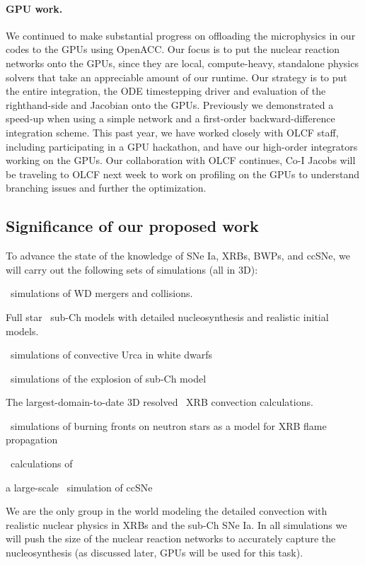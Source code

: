 \documentclass[11pt,letterpaper,english]{article}
\begin{document}
\paragraph{GPU work.}
%
We continued to make substantial progress on offloading the
microphysics in our codes to the GPUs using OpenACC.  Our focus is to
put the nuclear reaction networks onto the GPUs, since they are local,
compute-heavy, standalone physics solvers that take an appreciable
amount of our runtime. Our strategy is to put the entire integration,
the ODE timestepping driver and evaluation of the righthand-side and
Jacobian onto the GPUs.  Previously we demonstrated a speed-up when
using a simple network and a first-order backward-difference
integration scheme.  This past year, we have worked closely with OLCF
staff, including participating in a GPU hackathon, and have our
high-order integrators working on the GPUs.  Our collaboration
with OLCF continues, Co-I Jacobs will be traveling to OLCF next week
to work on profiling on the GPUs to understand branching issues and
further the optimization.




\subsection{Significance of our proposed work}

To advance the state of the knowledge of SNe Ia, XRBs, BWPs, and
ccSNe, we will carry out the following sets of simulations (all in
3D):
\begin{tightitem}
\item \castro\ simulations of WD mergers and collisions.
\item Full star \maestro\ sub-Ch models with detailed nucleosynthesis
  and realistic initial models.
\item \maestro\ simulations of convective Urca in white dwarfs
\item \flash\ simulations of the explosion of sub-Ch model
\item The largest-domain-to-date 3D resolved \maestro\ XRB convection
  calculations.
\item \castro\ simulations of burning fronts on neutron stars
  as a model for XRB flame propagation
\item \castro\ calculations of 
\item a large-scale \chimera\ simulation of ccSNe
\end{tightitem}

We are the only group in the world modeling the detailed convection
with realistic nuclear physics in XRBs and the sub-Ch SNe Ia.  In all
simulations we will push the size of the nuclear reaction networks to
accurately capture the nucleosynthesis (as discussed later, GPUs will
be used for this task).  
\end{document}
